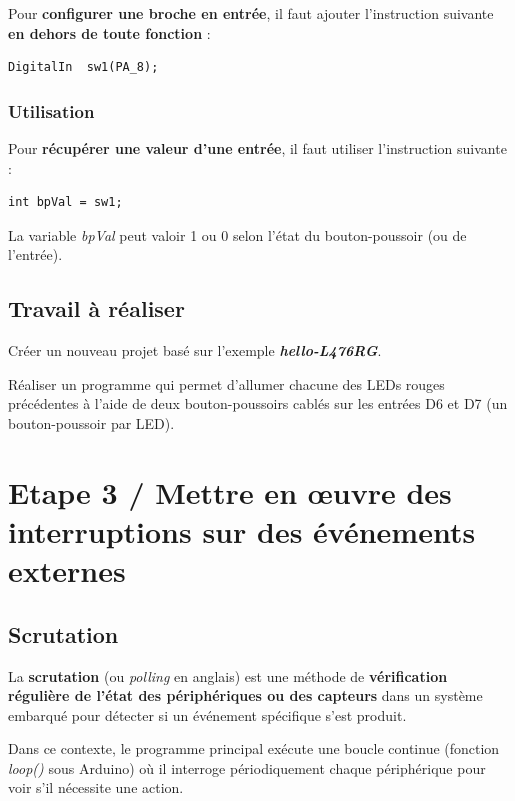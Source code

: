 \documentclass[a4paper,11pt,titlepage]{article} %
\begin{document}
Pour \textbf{configurer une broche en entrée}, il faut ajouter l'instruction suivante \textbf{en dehors de toute fonction} :

\begin{lstlisting}
DigitalIn  sw1(PA_8);
\end{lstlisting}

\subsubsection{Utilisation}

Pour \textbf{récupérer une valeur d'une entrée}, il faut utiliser l'instruction suivante :

\begin{lstlisting}
int bpVal = sw1;
\end{lstlisting}

La variable \textsl{bpVal} peut valoir \textsc{1} ou \textsc{0} selon l'état du bouton-poussoir (ou de l'entrée).

\subsection{Travail à réaliser}

\Manip Créer un nouveau projet basé sur l'exemple \textbf{\textsl{hello-L476RG}}.

\Manip Réaliser un programme qui permet d'allumer chacune des LEDs rouges précédentes à l'aide de deux bouton-poussoirs cablés sur les entrées D6 et D7 (un bouton-poussoir par LED).


\newpage
\section{Etape 3 / Mettre en \oe{}uvre des interruptions sur des événements externes}

\subsection{Scrutation}

La \textbf{scrutation} (ou \textit{polling} en anglais) est une méthode de \textbf{vérification régulière de l'état des périphériques ou des capteurs} dans un système embarqué pour détecter si un événement spécifique s'est produit. 

Dans ce contexte, le programme principal exécute une boucle continue (fonction \textsl{loop()} sous Arduino) où il interroge périodiquement chaque périphérique pour voir s'il nécessite une action. 
\end{document}
